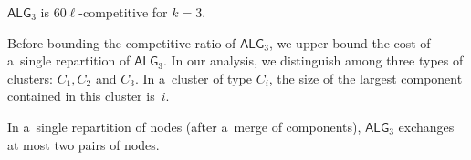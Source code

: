 \documentclass[a4paper,anonymous,USenglish]{lipics-v2019}
\newcommand{\TAlg}{{\ensuremath{\textsf{ALG}_{3}}}\xspace}
\begin{document}
\begin{theorem}
	\TAlg is $60\ell$-competitive for $k=3$.
	\label{thm:k=3}
\end{theorem}



Before bounding the competitive ratio of \TAlg, we upper-bound the cost of a~single repartition of \TAlg.
In our analysis, we distinguish among three types of clusters: $C_1, C_2$ and $C_3$. In a~cluster of type $C_i$, the size of the largest component contained in this cluster is~$i$.

\begin{lemma}
	\label{lem:1req}
	In a~single repartition of nodes (after a~merge of components), \TAlg exchanges at most two pairs of nodes.
\end{lemma}
\end{document}
